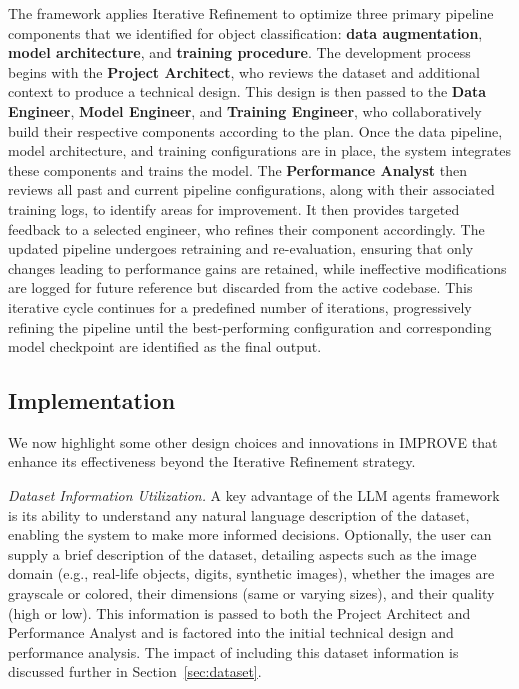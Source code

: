 The framework applies Iterative Refinement to optimize three primary pipeline components that we identified for object classification: \textbf{data augmentation}, \textbf{model architecture}, and \textbf{training procedure}. The development process begins with the \textbf{Project Architect}, who reviews the dataset and additional context to produce a technical design. This design is then passed to the \textbf{Data Engineer}, \textbf{Model Engineer}, and \textbf{Training Engineer}, who collaboratively build their respective components according to the plan. Once the data pipeline, model architecture, and training configurations are in place, the system integrates these components and trains the model. The \textbf{Performance Analyst} then reviews all past and current pipeline configurations, along with their associated training logs, to identify areas for improvement. It then provides targeted feedback to a selected engineer, who refines their component accordingly. The updated pipeline undergoes retraining and re-evaluation, ensuring that only changes leading to performance gains are retained, while ineffective modifications are logged for future reference but discarded from the active codebase. This iterative cycle continues for a predefined number of iterations, progressively refining the pipeline until the best-performing configuration and corresponding model checkpoint are identified as the final output.

\subsection{Implementation}
We now highlight some other design choices and innovations in IMPROVE that enhance its effectiveness beyond the Iterative Refinement strategy.

\textit{Dataset Information Utilization.}
A key advantage of the LLM agents framework is its ability to understand any natural language description of the dataset, enabling the system to make more informed decisions. Optionally, the user can supply a brief description of the dataset, detailing aspects such as the image domain (e.g., real-life objects, digits, synthetic images), whether the images are grayscale or colored, their dimensions (same or varying sizes), and their quality (high or low). This information is passed to both the Project Architect and Performance Analyst and is factored into the initial technical design and performance analysis. The impact of including this dataset information is discussed further in Section~\ref{sec:dataset}.


